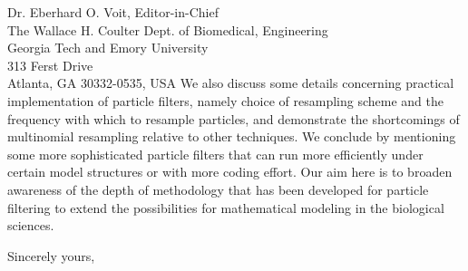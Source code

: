 \documentclass{letter} %
\begin{document}
\begin{letter}{Dr. Eberhard O. Voit, Editor-in-Chief \\
The Wallace H. Coulter Dept. of Biomedical, Engineering \\
Georgia Tech and Emory University \\
313 Ferst Drive \\
Atlanta, GA 30332-0535, USA
}
We also discuss some details concerning practical implementation of particle filters, namely choice of resampling scheme and the frequency with which to resample particles, and demonstrate the shortcomings of multinomial resampling relative to other techniques. We conclude by mentioning some more sophisticated particle filters that can run more efficiently under certain model structures or with more coding effort. Our aim here is to broaden awareness of the depth of methodology that has been developed for particle filtering to extend the possibilities for mathematical modeling in the biological sciences.

\closing{Sincerely yours,}

\end{letter}
\end{document}
